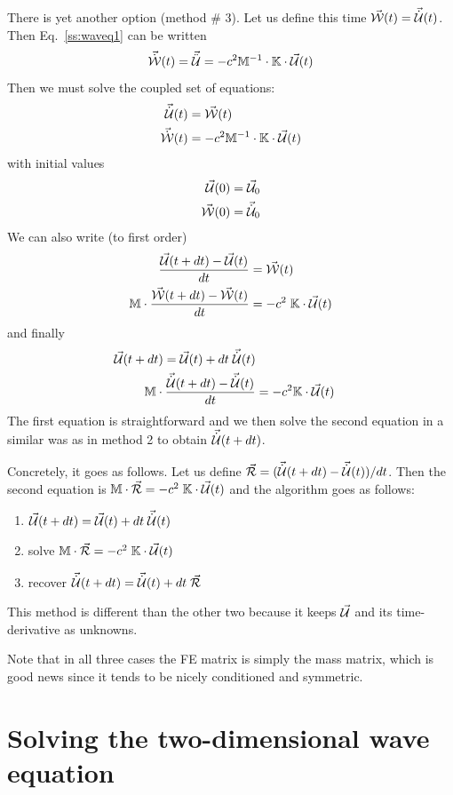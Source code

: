 There is yet another option (method \# 3). 
Let us define this time $\vec{\cal W}(t)=\vec{\dot{{\cal U}}}(t)$.
Then Eq.~\eqref{ss:waveq1} can be written 
\[
\vec{\dot{{\cal W}}}(t) = \vec{\ddot{{\cal U}}} = -c^2 {\mathbb{M}}^{-1} 
\cdot {\mathbb{K}} \cdot \vec{\cal U}(t)
\]
Then we must solve the coupled set of equations:
\begin{align}
\vec{\dot{{\cal U}}}(t) &= \vec{\cal W}(t) \\
\vec{\dot{{\cal W}}}(t) &= -c^2 {\mathbb{M}}^{-1} \cdot {\mathbb{K}} \cdot \vec{\cal U}(t) 
\end{align}
with initial values
\begin{align}
\vec{\cal U}(0) &= \vec{\cal U}_0 \\ 
\vec{\cal W}(0) &= \vec{\dot{{\cal U}}}_0
\end{align}
We can also write (to first order)
\begin{align}
\frac{\vec{\cal U}(t+dt)-\vec{\cal U}(t) }{dt}    &= \vec{\cal W}(t) \\
{\mathbb{M}} \cdot \frac{\vec{\cal W}(t+dt)-\vec{\cal W}(t) }{dt}  &= -c^2 \; {\mathbb{K}} \cdot \vec{\cal U}(t) 
\end{align}
and finally
\begin{align}
\vec{\cal U}(t+dt) = \vec{\cal U}(t) + dt \; \vec{\dot{{\cal U}}}(t) \\
{\mathbb{M}} \cdot \frac{\vec{\dot{{\cal U}}}(t+dt)-\vec{\dot{{\cal U}}}(t) }{dt}  &= -c^2 {\mathbb{K}} \cdot \vec{\cal U}(t) 
\end{align}
The first equation is straightforward and we then solve the second equation in a similar 
was as in method 2 to obtain $\vec{\dot{{\cal U}}}(t+dt)$.

Concretely, it goes as follows. Let us define 
$\vec{\cal R}= (\vec{\dot{{\cal U}}}(t+dt)-\vec{\dot{{\cal U}}}(t) )/dt$.
Then the second equation is ${\mathbb{M}} \cdot \vec{\cal R} = -c^2 \; {\mathbb{K}} \cdot \vec{\cal U}(t)$ 
and the algorithm goes 
as follows:
\begin{enumerate}
\item $\vec{\cal U}(t+dt) = \vec{\cal U}(t) + dt \; \vec{\dot{{\cal U}}}(t)$
\item solve ${\mathbb{M}} \cdot \vec{\cal R} = -c^2 \; {\mathbb{K}} \cdot \vec{\cal U}(t)$ 
\item recover $\vec{\dot{{\cal U}}}(t+dt) = \vec{\dot{{\cal U}}}(t) + dt \; \vec{\cal R}$
\end{enumerate}
This method is different than the other two because it keeps $\vec{\cal U}$ 
and its time-derivative as unknowns. 

Note that in all three cases the FE matrix is simply the mass matrix, 
which is good news since it tends to be nicely conditioned and symmetric.

\section{Solving the two-dimensional wave equation}




